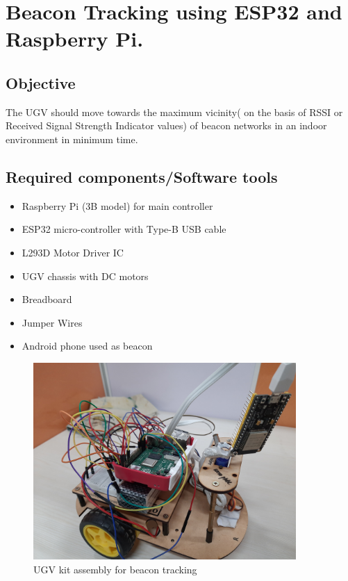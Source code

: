 \clearpage
\chapter{Beacon Tracking using ESP32 and Raspberry Pi.}
\section{Objective}
The UGV should move towards the maximum vicinity( on the basis of RSSI or Received Signal Strength Indicator  values) of beacon networks in an indoor environment in minimum time.

\section{Required components/Software tools}
\begin{itemize}
    \item Raspberry Pi (3B model) for main controller
    \item ESP32 micro-controller with Type-B USB cable
    \item L293D Motor Driver IC
    \item UGV chassis with DC motors
    \item Breadboard
    \item Jumper Wires
    \item Android phone used as beacon
\end{itemize}

\begin{figure}[h!]
\centering
\includegraphics[width=10cm]{./Figures/beacon_tracking.jpg}
\caption{UGV kit assembly for beacon tracking}
\label{beacon_tracking}
\end{figure}

